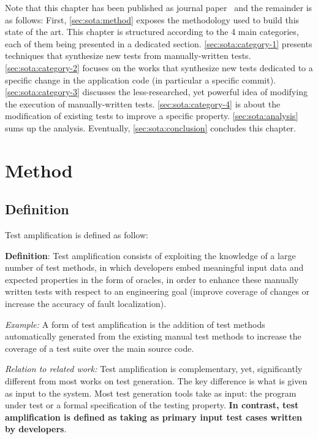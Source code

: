 Note that this chapter has been published as journal paper~\cite{DANGLOT2019110398} and the remainder is as follows:
First, \autoref{sec:sota:method}  exposes the methodology used to build this state of the art.
This chapter is structured according to the 4 main categories, each of them being presented in a dedicated section.
\autoref{sec:sota:category-1} presents techniques that synthesize new tests from manually-written tests.
\autoref{sec:sota:category-2} focuses on the works that synthesize new tests dedicated to a specific change in the application code (in particular a specific commit).
\autoref{sec:sota:category-3} discusses the less-researched, yet powerful idea of modifying the execution of manually-written tests. 
\autoref{sec:sota:category-4} is about the modification of existing tests to improve a specific property.
\autoref{sec:sota:analysis} sums up the analysis.
Eventually, \autoref{sec:sota:conclusion} concludes this chapter.

\section{Method}
\label{sec:sota:method}

\subsection{Definition}
\label{subsec:sota:method:definition}
Test amplification is defined as follow:

\begin{mdframed}
	\textbf{Definition}: Test amplification consists of exploiting the knowledge of a large number of test methods, in which developers embed meaningful input data and expected properties in the form of oracles, in order to enhance these manually written tests with respect to an engineering goal (\eg improve coverage of changes or increase the accuracy of fault localization).
\end{mdframed}

\emph{Example:} 
A form of test amplification is the addition of test methods automatically generated from the existing manual test methods to increase the coverage of a test suite over the main source code.

\emph{Relation to related work:} 
Test amplification is complementary, yet, significantly different from most works on test generation.
The key difference is what is given as input to the system.
Most test generation tools take as input:
the program under test or a formal specification of the testing property.
\textbf{In contrast, test amplification is defined as taking as primary input test cases written by developers}. 


